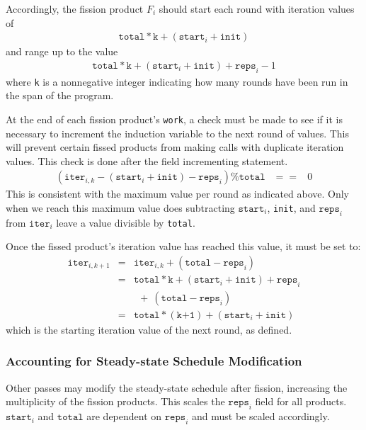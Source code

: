 Accordingly, the fission product $F_i$ should start each round with iteration values of
\begin{eqnarray*}
\texttt{total}*\texttt{k} + (\texttt{start}_i + \texttt{init})
\end{eqnarray*}
and range up to the value
\begin{eqnarray*}
\texttt{total}*\texttt{k} + (\texttt{start}_i + \texttt{init}) + \texttt{reps}_i - 1
\end{eqnarray*}
where \texttt{k} is a nonnegative integer indicating how many rounds have
been run in the span of the program.  

At the end of each fission product's \texttt{work}, a check must be made to see if it is necessary to increment the induction variable to the next round of values.  This will prevent certain fissed products from making calls with duplicate iteration values.  This check is done after the field incrementing statement.
\begin{eqnarray*}
(\texttt{iter}_{i,k} - (\texttt{start}_i + \texttt{init}) - \texttt{reps}_i) \% \texttt{total} &==& 0
\end{eqnarray*}
This is consistent with the maximum value per round as
indicated above.  Only when we reach this maximum value does subtracting 
$\texttt{start}_i$, \texttt{init}, and $\texttt{reps}_i$ from $\texttt{iter}_i$ leave a value divisible by
\texttt{total}.

Once the fissed product's iteration value has reached
this value, it must be set to:
\begin{eqnarray*}
\texttt{iter}_{i,k+1} &=& \texttt{iter}_{i,k} + (\texttt{total} - \texttt{reps}_i) \\
&=& \texttt{total}*\texttt{k} + (\texttt{start}_i + \texttt{init}) + \texttt{reps}_i \\
&&  \ \ +\ (\texttt{total} - \texttt{reps}_i) \\
&=& \texttt{total}*(\texttt{k+1}) + (\texttt{start}_i + \texttt{init})
\end{eqnarray*}
which is the starting iteration value of the next round, as defined.

\subsubsection{Accounting for Steady-state Schedule Modification}

Other passes may modify the steady-state schedule after fission, increasing the multiplicity of the fission products.  This scales the $\texttt{reps}_i$ field for all products.  $\texttt{start}_i$ and $\texttt{total}$ are dependent on $\texttt{reps}_i$ and must be scaled accordingly.

